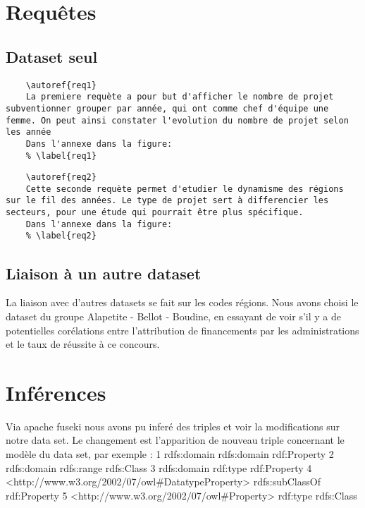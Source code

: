 \chapter{Requêtes}
\section{Dataset seul}

\begin{verbatim}
    \autoref{req1}
    La premiere requète a pour but d'afficher le nombre de projet subventionner grouper par année, qui ont comme chef d'équipe une femme. On peut ainsi constater l'evolution du nombre de projet selon les année
    Dans l'annexe dans la figure:
    % \label{req1}
\end{verbatim}

\begin{verbatim}
    \autoref{req2}
    Cette seconde requète permet d'etudier le dynamisme des régions sur le fil des années. Le type de projet sert à differencier les secteurs, pour une étude qui pourrait être plus spécifique.
    Dans l'annexe dans la figure:
    % \label{req2}
\end{verbatim}


\section{Liaison à un autre dataset}

La liaison avec d'autres datasets se fait sur les codes régions. Nous avons choisi le dataset du groupe Alapetite - Bellot - Boudine, en essayant de voir s'il y a de potentielles corélations entre l'attribution de financements par les administrations et le taux de réussite à ce concours.


\chapter{Inférences}

Via apache fuseki nous avons pu inferé des triples et voir la modifications sur notre data set. Le changement est l'apparition de nouveau triple concernant le modèle du data set, par exemple :
1	rdfs:domain rdfs:domain rdf:Property
2	rdfs:domain rdfs:range  rdfs:Class
3	rdfs:domain rdf:type    rdf:Property
4	<http://www.w3.org/2002/07/owl#DatatypeProperty>  rdfs:subClassOf rdf:Property
5	<http://www.w3.org/2002/07/owl#Property>  rdf:type  rdfs:Class

